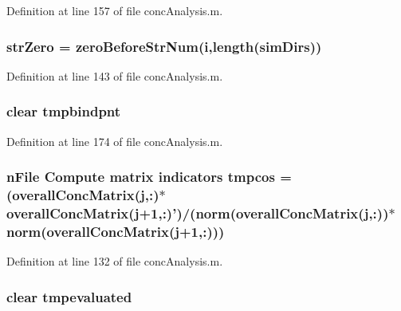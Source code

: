 Definition at line 157 of file conc\+Analysis.\+m.

\hypertarget{a00025_ab253e75f6224bf843e7a5ff2fb472e7d}{
\subsubsection[{str\+Zero}]{\setlength{\rightskip}{0pt plus 5cm}str\+Zero = zero\+Before\+Str\+Num({\bf i},length({\bf sim\+Dirs}))}}\label{a00025_ab253e75f6224bf843e7a5ff2fb472e7d}


Definition at line 143 of file conc\+Analysis.\+m.

\hypertarget{a00025_a5767512ebb74a4931fc7193b57426f9f}{
\subsubsection[{tmpbindpnt}]{\setlength{\rightskip}{0pt plus 5cm}clear tmpbindpnt}}\label{a00025_a5767512ebb74a4931fc7193b57426f9f}


Definition at line 174 of file conc\+Analysis.\+m.

\hypertarget{a00025_ab6beb59ba238329bfb9d4ed5a5486c5e}{
\subsubsection[{tmpcos}]{ {\bf n\+File} Compute matrix indicators tmpcos = ({\bf overall\+Conc\+Matrix}({\bf j},\+:)$\ast${\bf overall\+Conc\+Matrix}({\bf j}+1,\+:)')/(norm({\bf overall\+Conc\+Matrix}({\bf j},\+:))$\ast$norm({\bf overall\+Conc\+Matrix}({\bf j}+1,\+:)))}}\label{a00025_ab6beb59ba238329bfb9d4ed5a5486c5e}


Definition at line 132 of file conc\+Analysis.\+m.

\hypertarget{a00025_a4e591f841c52d48a504874598be0542a}{
\subsubsection[{tmpevaluated}]{\setlength{\rightskip}{0pt plus 5cm}clear tmpevaluated}}\label{a00025_a4e591f841c52d48a504874598be0542a}


